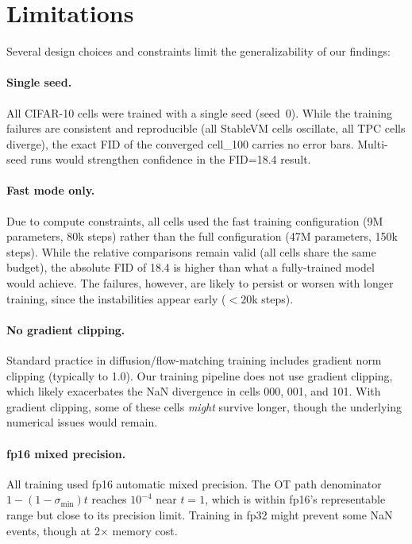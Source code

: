 \section{Limitations}
\label{sec:limitations}

Several design choices and constraints limit the generalizability of our findings:

\paragraph{Single seed.} All CIFAR-10 cells were trained with a single seed (seed~0). While the training failures are consistent and reproducible (all StableVM cells oscillate, all TPC cells diverge), the exact FID of the converged cell\_100 carries no error bars. Multi-seed runs would strengthen confidence in the FID=18.4 result.

\paragraph{Fast mode only.} Due to compute constraints, all cells used the fast training configuration (9M parameters, 80k steps) rather than the full configuration (47M parameters, 150k steps). While the relative comparisons remain valid (all cells share the same budget), the absolute FID of 18.4 is higher than what a fully-trained model would achieve. The failures, however, are likely to persist or worsen with longer training, since the instabilities appear early ($<20$k steps).

\paragraph{No gradient clipping.} Standard practice in diffusion/flow-matching training includes gradient norm clipping (typically to 1.0). Our training pipeline does not use gradient clipping, which likely exacerbates the NaN divergence in cells 000, 001, and 101. With gradient clipping, some of these cells \emph{might} survive longer, though the underlying numerical issues would remain.

\paragraph{fp16 mixed precision.} All training used fp16 automatic mixed precision. The OT path denominator $1-(1-\sigma_{\min})t$ reaches $10^{-4}$ near $t=1$, which is within fp16's representable range but close to its precision limit. Training in fp32 might prevent some NaN events, though at 2$\times$ memory cost.

